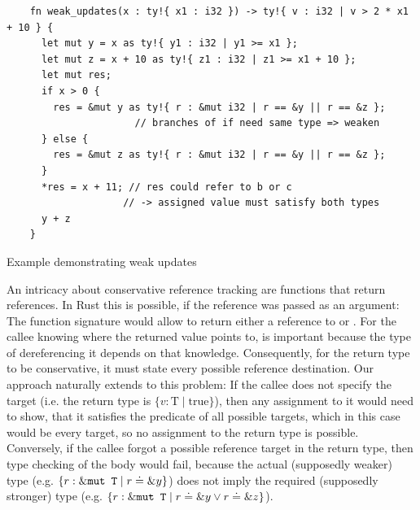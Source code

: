 \documentclass[twoside, english]{sdqthesis}
\theoremstyle{definition}
\begin{document}
\begin{listing}[ht]
  \begin{verbatim}
    fn weak_updates(x : ty!{ x1 : i32 }) -> ty!{ v : i32 | v > 2 * x1 + 10 } {
      let mut y = x as ty!{ y1 : i32 | y1 >= x1 };
      let mut z = x + 10 as ty!{ z1 : i32 | z1 >= x1 + 10 };
      let mut res;
      if x > 0 {
        res = &mut y as ty!{ r : &mut i32 | r == &y || r == &z };
                      // branches of if need same type => weaken
      } else {
        res = &mut z as ty!{ r : &mut i32 | r == &y || r == &z };
      }
      *res = x + 11; // res could refer to b or c 
                    // -> assigned value must satisfy both types
      y + z
    }
  \end{verbatim}
  \caption{Example demonstrating weak updates}
  \label{lst:mutation-weak}
\end{listing}

An intricacy about conservative reference tracking are functions that return references. In Rust this is possible, if the reference was passed as an argument: The function signature  would allow  to return either a reference to  or . For the callee knowing where the returned value points to, is important because the type of dereferencing it depends on that knowledge. 
Consequently, for the return type to be conservative, it must state every possible reference destination.
Our approach naturally extends to this problem: If the callee does not specify the target (i.e. the return type is $\{ v : \text{T} \mid \text{true}\}$), then any assignment to it would need to show, that it satisfies the predicate of all possible targets, which in this case would be every target, so no assignment to the return type is possible.
Conversely, if the callee forgot a possible reference target in the return type, then type checking of the body would fail, because the actual (supposedly weaker) type (e.g. $\{ r : \&\code{mut T} \mid r \doteq \&y \}$) does not imply the required (supposedly stronger) type (e.g. $\{ r : \&\code{mut T} \mid r \doteq \&y \vee r \doteq \&z \}$).



\end{document}

